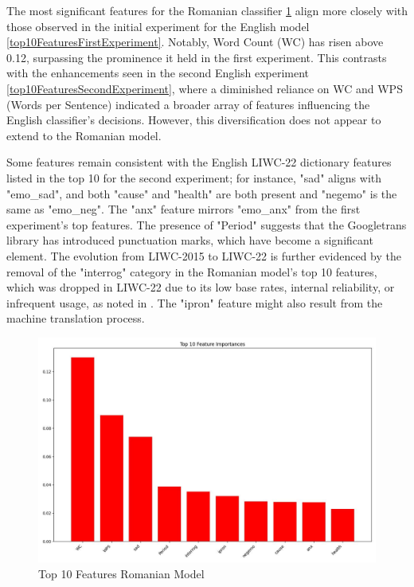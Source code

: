 \documentclass[3p,times,procedia]{elsarticle}
\begin{document}
The most significant features for the Romanian classifier \ref{top10FeaturesRomanianExperiment} align more closely with those observed in the initial experiment for the English model \ref{top10FeaturesFirstExperiment}. Notably, Word Count (WC) has risen above 0.12, surpassing the prominence it held in the first experiment. This contrasts with the enhancements seen in the second English experiment \ref{top10FeaturesSecondExperiment}, where a diminished reliance on WC and WPS (Words per Sentence) indicated a broader array of features influencing the English classifier’s decisions. However, this diversification does not appear to extend to the Romanian model.

Some features remain consistent with the English LIWC-22 dictionary features listed in the top 10 for the second experiment; for instance, "sad" aligns with "emo\_sad", and both "cause" and "health" are both present and "negemo" is the same as "emo\_neg". The "anx" feature mirrors "emo\_anx" from the first experiment’s top features. The presence of "Period" suggests that the Googletrans library has introduced punctuation marks, which have become a significant element. The evolution from LIWC-2015 to LIWC-22 is further evidenced by the removal of the "interrog" category in the Romanian model’s top 10 features, which was dropped in LIWC-22 due to its low base rates, internal reliability, or infrequent usage, as noted in \cite{boyd2022development}. The "ipron" feature might also result from the machine translation process.

\begin{figure}[htbp]
	\centering
		\includegraphics[scale=0.5]{./figures/metrics/experimentRomanian/top10features.jpg}
	\caption{Top 10 Features Romanian Model}
	\label{top10FeaturesRomanianExperiment}
\end{figure}
\end{document}
